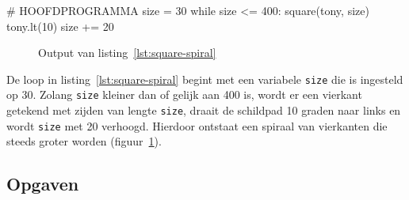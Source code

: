 \documentclass[../main]{subfiles}
\begin{document}
\begin{python}[style=mu, caption={Spiraal van vierkanten}, label={lst:square-spiral}, firstnumber=11]
# HOOFDPROGRAMMA
size = 30
while size <= 400:
    square(tony, size)
    tony.lt(10)
    size += 20
\end{python}

\begin{figure}[ht]
    \centering
    \caption{Output van listing~\ref{lst:square-spiral}}%
    \label{fig:turtle-square-spiral}
\end{figure}

De loop in listing~\ref{lst:square-spiral} begint met een variabele \texttt{size} die is ingesteld op 30. Zolang \texttt{size} kleiner dan of gelijk aan 400 is, wordt er een vierkant getekend met zijden van lengte \texttt{size}, draait de schildpad 10 graden naar links en wordt \texttt{size} met 20 verhoogd. Hierdoor ontstaat een spiraal van vierkanten die steeds groter worden (figuur~\ref{fig:turtle-square-spiral}).

\subsection*{Opgaven}
\end{document}
